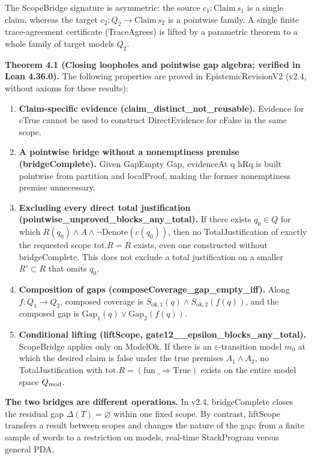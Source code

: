 \documentclass[11pt,a4paper]{article}
\begin{document}
The ScopeBridge signature is asymmetric: the source \(c_1:\mathrm{Claim}\,s_1\) is a single claim, whereas the target \(c_2:Q_2\to\mathrm{Claim}\,s_2\) is a pointwise family. A single finite trace-agreement certificate (TraceAgrees) is lifted by a parametric theorem to a whole family of target models \(Q_2\).

\textbf{Theorem 4.1 (Closing loopholes and pointwise gap algebra; verified in Lean 4.36.0).} The following properties are proved in EpistemicRevisionV2 (v2.4, without axioms for these results):

\begin{enumerate}
\item \textbf{Claim-specific evidence (claim\_\allowbreak distinct\_\allowbreak not\_\allowbreak reusable).} Evidence for cTrue cannot be used to construct DirectEvidence for cFalse in the same scope.
\item \textbf{A pointwise bridge without a nonemptiness premise (bridgeComplete).} Given GapEmpty Gap, evidenceAt q hRq is built pointwise from partition and localProof, making the former nonemptiness premise unnecessary.
\item \textbf{Excluding every direct total justification (pointwise\_\allowbreak unproved\_\allowbreak blocks\_\allowbreak any\_\allowbreak total).} If there exists \(q_0\in Q\) for which \(R(q_0)\land A\land\neg\mathrm{Denote}(c(q_0))\), then no TotalJustification of exactly the requested scope \(\mathrm{tot}.R=R\) exists, even one constructed without bridgeComplete. This does not exclude a total justification on a smaller \(R'\subset R\) that omits \(q_0\).
\item \textbf{Composition of gaps (composeCoverage\_\allowbreak gap\_\allowbreak empty\_\allowbreak iff).} Along \(f:Q_1\to Q_2\), composed coverage is \(S_{\mathrm{ok},1}(q)\land S_{\mathrm{ok},2}(f(q))\), and the composed gap is \(\mathrm{Gap}_1(q)\lor\mathrm{Gap}_2(f(q))\).
\item \textbf{Conditional lifting (liftScope, gate12\_\_\allowbreak epsilon\_\allowbreak blocks\_\allowbreak any\_\allowbreak total).} ScopeBridge applies only on ModelOk. If there is an \(\varepsilon\)-transition model \(m_0\) at which the desired claim is false under the true premises \(A_1\land A_2\), no TotalJustification with \(\mathrm{tot}.R=(\mathrm{fun}\ \_\Rightarrow\mathrm{True})\) exists on the entire model space \(Q_{\rm mod}\).

\end{enumerate}
\textbf{The two bridges are different operations.} In v2.4, bridgeComplete closes the residual gap \(\Delta(T)=\varnothing\) within one fixed scope. By contrast, liftScope transfers a result between scopes and changes the nature of the gap: from a finite sample of words to a restriction on models, real-time StackProgram versus general PDA.
\end{document}
